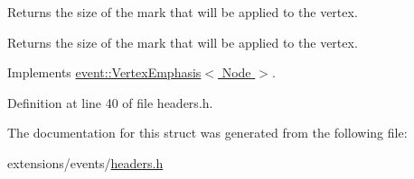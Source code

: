 Returns the size of the mark that will be applied to the vertex. 

\begin{DoxyReturn}{Returns}
the size of the mark that will be applied to the vertex. 
\end{DoxyReturn}


Implements \hyperlink{structevent_1_1VertexEmphasis_a2213738af67f360ce354f237052ed4fb}{event\+::\+Vertex\+Emphasis$<$ Node $>$}.



Definition at line 40 of file headers.\+h.



The documentation for this struct was generated from the following file\+:\begin{DoxyCompactItemize}
\item 
extensions/events/\hyperlink{extensions_2events_2headers_8h}{headers.\+h}\end{DoxyCompactItemize}
